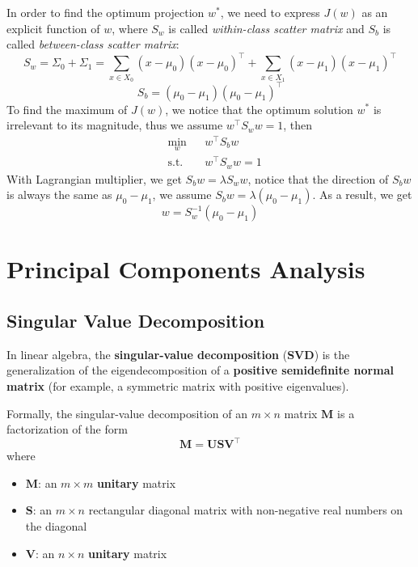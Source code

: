 \documentclass[a4paper, 12pt]{book} %
\begin{document}
In order to find the optimum projection $w^*$, we need to express $J(w)$ as an explicit function of $w$, where $S_w$ is called \emph{within-class scatter matrix} and $S_b$ is called \emph{between-class scatter matrix}:
$$S_w=\Sigma_0 + \Sigma_1=\sum_{x\in X_0}{(x-\mu_0)(x-\mu_0)^\top}+\sum_{x\in X_1}{(x-\mu_1)(x-\mu_1)^\top}$$
$$S_b=(\mu_0-\mu_1)(\mu_0-\mu_1)^\top$$
To find the maximum of $J(w)$, we notice that the optimum solution $w^*$ is irrelevant to its magnitude, thus we assume $w^\top S_ww=1$, then
\begin{equation*}
\begin{aligned}
& \underset{w}{\mathrm{min}}
& & w^\top S_bw \\
& \mathrm{s.t.}
& & w^\top S_ww=1
\end{aligned}
\end{equation*}
With Lagrangian multiplier, we get 
$S_bw=\lambda S_ww$, notice that the direction of $S_bw$ is always the same as $\mu_0-\mu_1$, we assume $S_bw=\lambda{(\mu_0-\mu_1)}$. As a result, we get 
\begin{equation}
w=S_w^{-1}(\mu_0-\mu_1)
\end{equation}

\section{Principal Components Analysis}
\subsection{Singular Value Decomposition}
In linear algebra, the \textbf{singular-value decomposition} (\textbf{SVD}) is the generalization of the eigendecomposition of a \textbf{positive semidefinite normal matrix} (for example, a symmetric matrix with positive eigenvalues).

Formally, the singular-value decomposition of an $m\times n$ matrix $\mathbf{M}$ is a factorization of the form
\begin{equation}
	\mathbf{M} = \mathbf{U}\mathbf{S}\mathbf{V^\top}
\end{equation}
where 
\begin{itemize}
	\item $\mathbf{M}$: an $m\times m$ \textbf{unitary} matrix
	\item $\mathbf{S}$: an $ m\times n$ rectangular diagonal matrix with non-negative real numbers on the diagonal
	\item $\mathbf{V}$: an $n\times n$ \textbf{unitary} matrix
\end{itemize}
\end{document}
